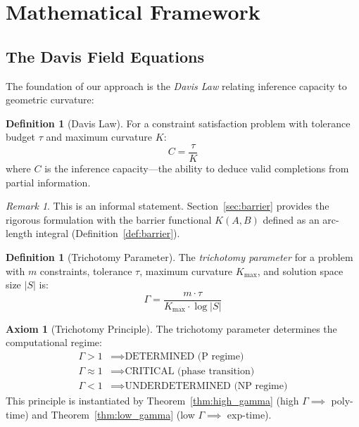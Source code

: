 \documentclass[11pt,a4paper]{article}
\theoremstyle{plain}
\theoremstyle{definition}
\newtheorem{definition}[theorem]{Definition}
\newtheorem{axiom}[theorem]{Axiom}
\theoremstyle{remark}
\newtheorem{remark}[theorem]{Remark}
\begin{document}
\section{Mathematical Framework}

\subsection{The Davis Field Equations}

The foundation of our approach is the \emph{Davis Law} relating inference capacity to geometric curvature:

\begin{definition}[Davis Law]
For a constraint satisfaction problem with tolerance budget $\tau$ and maximum curvature $K$:
\begin{equation}
    C = \frac{\tau}{K}
\end{equation}
where $C$ is the inference capacity---the ability to deduce valid completions from partial information.
\end{definition}

\begin{remark}
This is an informal statement. Section~\ref{sec:barrier} provides the rigorous formulation with the barrier functional $K(A,B)$ defined as an arc-length integral (Definition~\ref{def:barrier}).
\end{remark}

\begin{definition}[Trichotomy Parameter]\label{def:gamma}
The \emph{trichotomy parameter} for a problem with $m$ constraints, tolerance $\tau$, maximum curvature $K_{\max}$, and solution space size $|S|$ is:
\begin{equation}
    \Gamma = \frac{m \cdot \tau}{K_{\max} \cdot \log|S|}
\end{equation}
\end{definition}

\begin{axiom}[Trichotomy Principle]\label{ax:trichotomy}
The trichotomy parameter determines the computational regime:
\begin{align}
    \Gamma > 1 &\implies \text{DETERMINED (P regime)} \\
    \Gamma \approx 1 &\implies \text{CRITICAL (phase transition)} \\
    \Gamma < 1 &\implies \text{UNDERDETERMINED (NP regime)}
\end{align}
This principle is instantiated by Theorem~\ref{thm:high_gamma} (high $\Gamma \implies$ poly-time) and Theorem~\ref{thm:low_gamma} (low $\Gamma \implies$ exp-time).
\end{axiom}
\end{document}
